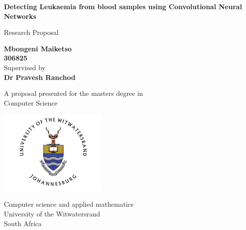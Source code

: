 \begin{titlepage}
    \begin{center}
        \vspace*{1cm}
            
        \Huge
        \textbf{Detecting Leukaemia from blood samples using Convolutional Neural Networks}
            
        \vspace{1.5cm}
        \LARGE
        Research Proposal
            
            
        \textbf{Mbongeni Maiketso}\\
        \textbf{306825}\\
  
        \LARGE
        \vspace{1.0cm}
        Supervised by\\
        \textbf{Dr Pravesh Ranchod}    
        \vfill
            
        A proposal presented for the masters degree in\\
        Computer Science
            
        \vspace{0.8cm}
            
        \includegraphics[width=0.4\textwidth]{WitsUniversitylogo.jpg}
            
        \Large
        Computer science and applied mathematics\\
        University of the Witwatersrand\\
        South Africa\\
        \date{\today}
            
    \end{center}
\end{titlepage}